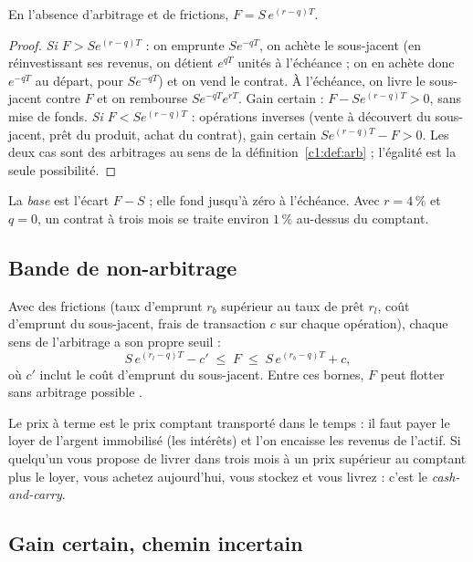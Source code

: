 \begin{proposition}[Portage]\label{c14:prop:carry}
En l'absence d'arbitrage et de frictions, $F = S\,e^{(r-q)T}$.
\end{proposition}
\begin{proof}
\emph{Si $F > Se^{(r-q)T}$} : on emprunte $Se^{-qT}$, on achète le sous-jacent (en réinvestissant ses revenus, on détient $e^{qT}$ unités à l'échéance ; on en achète donc $e^{-qT}$ au départ, pour $Se^{-qT}$) et on vend le contrat. À l'échéance, on livre le sous-jacent contre $F$ et on rembourse $Se^{-qT}e^{rT}$. Gain certain : $F - Se^{(r-q)T} > 0$, sans mise de fonds. \emph{Si $F < Se^{(r-q)T}$} : opérations inverses (vente à découvert du sous-jacent, prêt du produit, achat du contrat), gain certain $Se^{(r-q)T} - F > 0$. Les deux cas sont des arbitrages au sens de la définition~\ref{c1:def:arb} ; l'égalité est la seule possibilité.
\end{proof}

La \emph{base} est l'écart $F - S$ ; elle \og fond\fg{} jusqu'à zéro à l'échéance. Avec $r = 4\,\%$ et $q = 0$, un contrat à trois mois se traite environ $1\,\%$ au-dessus du comptant.

\subsection{Bande de non-arbitrage}

Avec des frictions (taux d'emprunt $r_b$ supérieur au taux de prêt $r_l$, coût d'emprunt du sous-jacent, frais de transaction $c$ sur chaque opération), chaque sens de l'arbitrage a son propre seuil :
\[
S\,e^{(r_l - q)T} - c' \;\le\; F \;\le\; S\,e^{(r_b - q)T} + c,
\]
où $c'$ inclut le coût d'emprunt du sous-jacent. Entre ces bornes, $F$ peut flotter sans arbitrage possible \citep{hull2022}.

\begin{intuition}
Le prix à terme est le prix comptant \og transporté dans le temps\fg{} : il faut payer le loyer de l'argent immobilisé (les intérêts) et l'on encaisse les revenus de l'actif. Si quelqu'un vous propose de livrer dans trois mois à un prix supérieur au comptant plus le loyer, vous achetez aujourd'hui, vous stockez et vous livrez : c'est le \emph{cash-and-carry}.
\end{intuition}

\subsection{Gain certain, chemin incertain}

